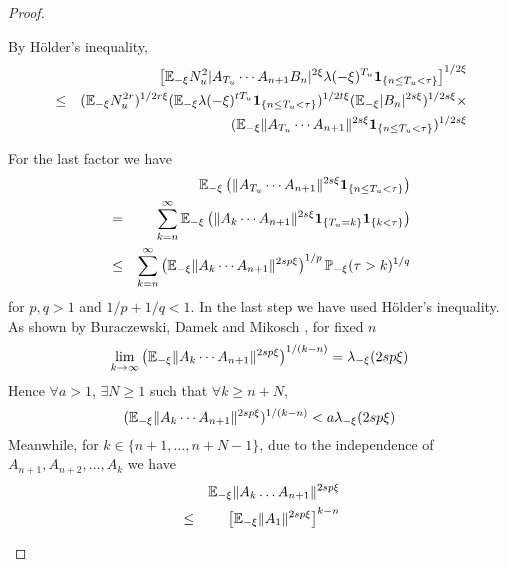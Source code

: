 \documentclass{article}
\theoremstyle{remark}
\begin{document}
\begin{proof}
\begin{enumerate}
\begin{enumerate}
      By H\"older's inequality,
      \begin{eqnarray}
        && \left[ \mathbb{E}_{-\xi} N_u^2 
          |A_{T_u} \cdots A_{n+1} B_n|^{2\xi}
          \lambda(-\xi)^{T_u}
          \mathbf{1}_{\{n \leq T_u < \tau\}} \right]^{1/2\xi} \nonumber \\
        &\leq& (\mathbb{E}_{-\xi} N_u^{2r})^{1/2r\xi}
        (\mathbb{E}_{-\xi} \lambda(-\xi)^{tT_u}\mathbf{1}_{\{n \leq T_u < \tau\}})^{1/2t\xi}
        (\mathbb{E}_{-\xi}|B_n|^{2s\xi})^{1/2s\xi}  \times \nonumber \\
        && (\mathbb{E}_{-\xi} \|A_{T_u} \cdots A_{n+1}\|^{2s\xi}
        \mathbf{1}_{\{n \leq T_u < \tau\}})^{1/2s\xi}
        \label{eq:xi_above_half}
      \end{eqnarray}

      For the last factor we have
      \begin{eqnarray*}
        && \mathbb{E}_{-\xi}\left(\|A_{T_u} \cdots A_{n+1}\|^{2s\xi}
        \mathbf{1}_{\{n \leq T_u < \tau\}}\right) \\
        &=& \sum_{k=n}^\infty \mathbb{E}_{-\xi} \left(
          \|A_k \cdots A_{n+1}\|^{2s\xi}
        \mathbf{1}_{\{T_u = k\}} \mathbf{1}_{\{k < \tau\}}\right)  \\
      &\leq& \sum_{k=n}^\infty
       \left(\mathbb{E}_{-\xi}
         \|A_k \cdots A_{n+1}\|^{2sp\xi}
       \right)^{1/p}
      \mathbb{P}_{-\xi}(\tau > k)^{1/q}
      \end{eqnarray*}
      for $p,q > 1$ and $1/p + 1/q < 1$. In the last step we have used
      H\"older's inequality. As shown by Buraczewski, Damek
      and Mikosch \cite{BuraczewskiDamekMikosch2015}, for fixed $n$
      \[
      \lim_{k \to \infty}
      \left( \mathbb{E}_{-\xi}
        \|A_k \cdots A_{n+1}\|^{2sp\xi}
      \right)^{1/(k-n)} = \lambda_{-\xi}(2sp\xi)
      \]
      Hence $\forall a > 1$, $\exists N \geq 1$ such that $\forall k
      \geq n + N$,
      \[
      (\mathbb{E}_{-\xi}\|A_{k} \cdots A_{n+1}\|^{2sp\xi})^{1/(k-n)} <
      a \lambda_{-\xi}(2sp\xi)
      \]
      Meanwhile, for $k \in \{n+1, \dots, n+N-1\}$, due to the
      independence of $A_{n+1}, A_{n+2}, \dots, A_k$ we have
      \begin{eqnarray*}
        && \E_{-\xi} \|A_k \dots A_{n+1}\|^{2sp\xi} \\
        &\leq& \left[\E_{-\xi} \|A_1\|^{2sp\xi}\right]^{k-n} \\

\end{eqnarray*}
\end{enumerate}
\end{enumerate}
\end{proof}
\end{document}
